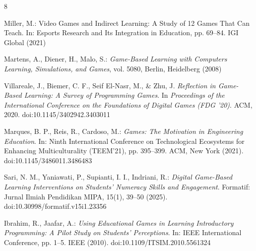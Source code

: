\documentclass[runningheads]{llncs}
\begin{document}
%
%
%
% 
% 
%
\begin{thebibliography}{8}

%
%
%

Miller, M.: Video Games and Indirect Learning: A Study of 12 Games That Can Teach. In: Esports Research and Its Integration in Education, pp. 69--84. IGI Global (2021)

Martens, A., Diener, H., Malo, S.:
\textit{Game-Based Learning with Computers Learning, Simulations, and Games}, vol. 5080, Berlin, Heidelberg (2008)

Villareale, J., Biemer, C. F., Seif El-Nasr, M., \& Zhu, J.
\textit{Reflection in Game-Based Learning: A Survey of Programming Games}.
In \textit{Proceedings of the International Conference on the Foundations of Digital Games (FDG '20)}.
ACM, 2020.
doi:10.1145/3402942.3403011

Marques, B. P., Reis, R., Cardoso, M.:
\textit{Games: The Motivation in Engineering Education}.
In: Ninth International Conference on Technological Ecosystems for Enhancing Multiculturality (TEEM'21),
pp. 395--399. ACM, New York (2021).
doi:10.1145/3486011.3486483

Sari, N. M., Yaniawati, P., Supianti, I. I., Indriani, R.:
\textit{Digital Game-Based Learning Interventions on Students' Numeracy Skills and Engagement}.
Formatif: Jurnal Ilmiah Pendidikan MIPA, 15(1), 39--50 (2025).
doi:10.30998/formatif.v15i1.23356

Ibrahim, R., Jaafar, A.:
\textit{Using Educational Games in Learning Introductory Programming: A Pilot Study on Students' Perceptions}.
In: IEEE International Conference, pp. 1--5. IEEE (2010).
doi:10.1109/ITSIM.2010.5561324


\end{thebibliography}
\end{document}
